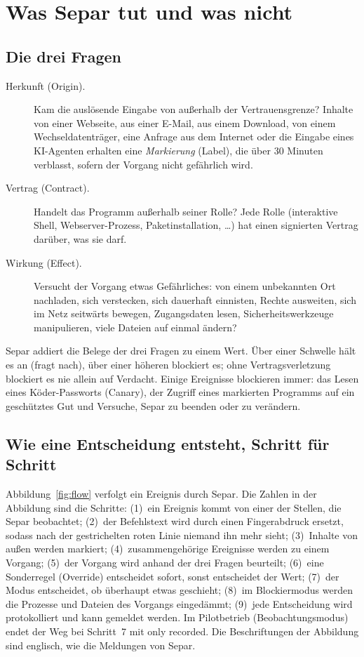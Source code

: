 \documentclass[11pt,a4paper]{article}
\begin{document}
\section{Was Separ tut und was nicht}
\label{sec:does}

\subsection{Die drei Fragen}
\begin{description}
  \item[Herkunft (Origin).] Kam die auslösende Eingabe von außerhalb der Vertrauensgrenze? Inhalte
    von einer Webseite, aus einer E-Mail, aus einem Download, von einem Wechseldatenträger, eine
    Anfrage aus dem Internet oder die Eingabe eines KI-Agenten erhalten eine \emph{Markierung}
    (Label), die über 30 Minuten verblasst, sofern der Vorgang nicht gefährlich wird.
  \item[Vertrag (Contract).] Handelt das Programm außerhalb seiner Rolle? Jede Rolle (interaktive
    Shell, Webserver-Prozess, Paketinstallation, \ldots) hat einen signierten Vertrag darüber, was
    sie darf.
  \item[Wirkung (Effect).] Versucht der Vorgang etwas Gefährliches: von einem unbekannten Ort
    nachladen, sich verstecken, sich dauerhaft einnisten, Rechte ausweiten, sich im Netz seitwärts
    bewegen, Zugangsdaten lesen, Sicherheitswerkzeuge manipulieren, viele Dateien auf einmal
    ändern?
\end{description}
Separ addiert die Belege der drei Fragen zu einem Wert. Über einer Schwelle hält es an (fragt
nach), über einer höheren blockiert es; ohne Vertragsverletzung blockiert es nie allein auf
Verdacht. Einige Ereignisse blockieren immer: das Lesen eines Köder-Passworts (Canary), der
Zugriff eines markierten Programms auf ein geschütztes Gut und Versuche, Separ zu beenden oder zu
verändern.

\subsection{Wie eine Entscheidung entsteht, Schritt für Schritt}
\label{sec:flow}
Abbildung~\ref{fig:flow} verfolgt ein Ereignis durch Separ. Die Zahlen in der Abbildung sind die
Schritte: (1)~ein Ereignis kommt von einer der Stellen, die Separ beobachtet; (2)~der Befehlstext
wird durch einen Fingerabdruck ersetzt, sodass nach der gestrichelten roten Linie niemand ihn mehr
sieht; (3)~Inhalte von außen werden markiert; (4)~zusammengehörige Ereignisse werden zu einem
Vorgang; (5)~der Vorgang wird anhand der drei Fragen beurteilt; (6)~eine Sonderregel (Override)
entscheidet sofort, sonst entscheidet der Wert; (7)~der Modus entscheidet, ob überhaupt etwas
geschieht; (8)~im Blockiermodus werden die Prozesse und Dateien des Vorgangs eingedämmt; (9)~jede
Entscheidung wird protokolliert und kann gemeldet werden. Im Pilotbetrieb (Beobachtungsmodus)
endet der Weg bei Schritt~7 mit \glqq only recorded\grqq. Die Beschriftungen der Abbildung sind
englisch, wie die Meldungen von Separ.
\end{document}

